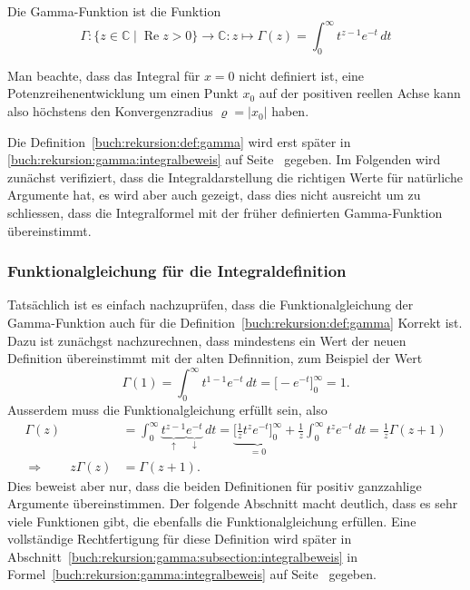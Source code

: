 \begin{definition}
\label{buch:rekursion:def:gamma}
Die Gamma-Funktion ist die Funktion 
\begin{equation}
\Gamma
\colon
\{z\in\mathbb{C} \mid \operatorname{Re}z>0\}
\to \mathbb{C}
:
z
\mapsto
\Gamma(z) = \int_0^\infty t^{z-1}e^{-t}\,dt
\label{buch:rekursion:eqn:gammaintegral}
\end{equation}
%
%
\end{definition}

Man beachte, dass das Integral für $x=0$ nicht definiert ist, eine
Potenzreihenentwicklung um einen Punkt $x_0$ auf der positiven reellen
Achse kann also höchstens den Konvergenzradius $\varrho=|x_0|$ haben.

Die Definition~\ref{buch:rekursion:def:gamma} wird erst später in
\eqref{buch:rekursion:gamma:integralbeweis} auf
Seite~\pageref{buch:rekursion:gamma:integralbeweis} gegeben.
Im Folgenden wird zunächst verifiziert, dass die Integraldarstellung
die richtigen Werte für natürliche Argumente hat, es wird aber auch
gezeigt, dass dies nicht ausreicht um zu schliessen, dass die
Integralformel mit der früher definierten Gamma-Funktion übereinstimmt.

%
%
\subsubsection{Funktionalgleichung für die Integraldefinition}
Tatsächlich ist es einfach nachzuprüfen, dass die Funktionalgleichung
der Gamma-Funktion auch für die Definition~\ref{buch:rekursion:def:gamma}
Korrekt ist. 
Dazu ist zunächgst nachzurechnen, dass mindestens ein Wert der neuen 
Definition übereinstimmt mit der alten Definnition, zum Beispiel der
Wert
\[
\Gamma(1)
=
\int_0^\infty t^{1-1}e^{-t}\,dt
=
\biggl[ -e^{-t} \biggr]_0^\infty
=
1.
\]
Ausserdem muss die Funktionalgleichung erfüllt sein, also
\begin{align*}
\Gamma(z)
&=
\int_0^\infty
\underbrace{t^{z-1}}_{\displaystyle\uparrow}
\underbrace{e^{-t}}_{\displaystyle\downarrow}
\,dt
=
\underbrace{\biggl[
\frac{1}{z} t^z e^{-t}
\biggr]_0^\infty}_{\displaystyle=0}
+
\frac{1}{z}
\int_0^\infty
t^z e^{-t}
\,dt
=
\frac{1}{z}\Gamma(z+1)
\\
\Rightarrow\qquad
z\Gamma(z)&=\Gamma(z+1).
\end{align*}
Dies beweist aber nur, dass die beiden Definitionen für positiv
ganzzahlige Argumente übereinstimmen.
Der folgende Abschnitt macht deutlich, dass es sehr viele Funktionen gibt,
die ebenfalls die Funktionalgleichung erfüllen.
Eine vollständige Rechtfertigung für diese Definition wird später
in Abschnitt~\ref{buch:rekursion:gamma:subsection:integralbeweis}
in Formel~\eqref{buch:rekursion:gamma:integralbeweis}
auf Seite~\pageref{buch:rekursion:gamma:integralbeweis}
gegeben.

